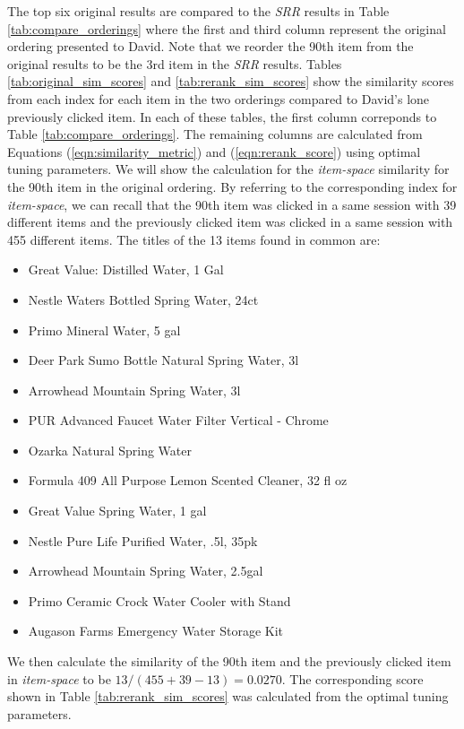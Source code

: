 \documentclass{article}
\begin{document}
The top six original results are compared to the {\em SRR} results in Table
\ref{tab:compare_orderings} where the first and third column represent the
original ordering presented to David. Note that we reorder the 90th item from the
original results to be the 3rd item in the {\em SRR} results.
Tables \ref{tab:original_sim_scores} and \ref{tab:rerank_sim_scores} show the
similarity scores from each index for each item in the two orderings compared to
David's lone previously clicked item. In each of these tables, the first column
correponds to Table \ref{tab:compare_orderings}. The remaining columns are
calculated from Equations (\ref{eqn:similarity_metric}) and
(\ref{eqn:rerank_score}) using optimal tuning parameters.
We will show the calculation for the {\em item-space} similarity for the 90th
item in the original ordering. By referring to the corresponding index for {\em
item-space}, we can recall that the 90th item was clicked in a same session with
39 different items and the previously clicked item was clicked in a same session
with 455 different items. The titles of the 13 items found in common are:
\begin{itemize}
    \item[] Great Value: Distilled Water, 1 Gal
    \item[] Nestle Waters Bottled Spring Water, 24ct
    \item[] Primo Mineral Water, 5 gal
    \item[] Deer Park Sumo Bottle Natural Spring Water, 3l
    \item[] Arrowhead Mountain Spring Water, 3l
    \item[] PUR Advanced Faucet Water Filter Vertical - Chrome
    \item[] Ozarka Natural Spring Water
    \item[] Formula 409 All Purpose Lemon Scented Cleaner, 32 fl oz
    \item[] Great Value Spring Water, 1 gal
    \item[] Nestle Pure Life Purified Water, .5l, 35pk
    \item[] Arrowhead Mountain Spring Water, 2.5gal
    \item[] Primo Ceramic Crock Water Cooler with Stand
    \item[] Augason Farms Emergency Water Storage Kit
\end{itemize}
We then calculate the similarity of the 90th item and the previously clicked
item in {\em item-space} to be $13/(455+39-13)=0.0270$. The corresponding score
shown in Table \ref{tab:rerank_sim_scores} was calculated from the optimal tuning
parameters.
\end{document}
